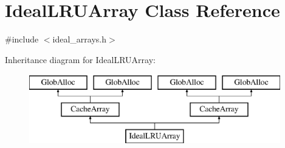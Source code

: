 \hypertarget{classIdealLRUArray}{\section{Ideal\-L\-R\-U\-Array Class Reference}
\label{classIdealLRUArray}
}


{\ttfamily \#include $<$ideal\-\_\-arrays.\-h$>$}

Inheritance diagram for Ideal\-L\-R\-U\-Array\-:\begin{figure}[H]
\begin{center}
\leavevmode
\includegraphics[height=3.000000cm]{classIdealLRUArray}
\end{center}
\end{figure}
